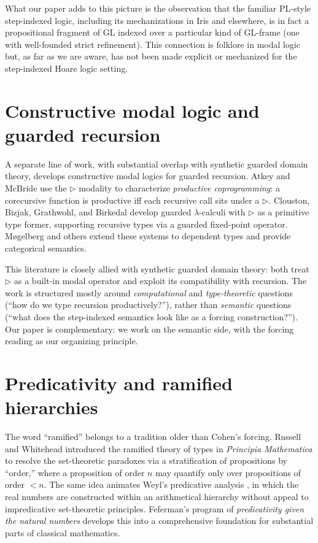 \documentclass[11pt]{article}
\begin{document}
What our paper adds to this picture is the observation that the
familiar PL-style step-indexed logic, including its mechanizations in
Iris and elsewhere, is in fact a propositional fragment of \textsf{GL}
indexed over a particular kind of \textsf{GL}-frame (one with
well-founded strict refinement). This connection is folklore in modal
logic but, as far as we are aware, has not been made explicit or
mechanized for the step-indexed Hoare logic setting.

\section{Constructive modal logic and guarded recursion}

A separate line of work, with substantial overlap with synthetic
guarded domain theory, develops constructive modal logics for
guarded recursion. Atkey and McBride \cite{atkey-mcbride2013} use the
$\triangleright$ modality to characterize \emph{productive
coprogramming}: a corecursive function is productive iff each recursive
call sits under a $\triangleright$. Clouston, Bizjak, Grathwohl, and
Birkedal \cite{clouston-et-al-2015,clouston-et-al-2017} develop
guarded $\lambda$-calculi with $\triangleright$ as a primitive type
former, supporting recursive types via a guarded fixed-point operator.
Møgelberg and others \cite{mogelberg2014,bizjak-mogelberg-2018}
extend these systems to dependent types and provide categorical
semantics.

This literature is closely allied with synthetic guarded domain
theory: both treat $\triangleright$ as a built-in modal operator and
exploit its compatibility with recursion. The work is structured
mostly around \emph{computational} and \emph{type-theoretic} questions
(``how do we type recursion productively?''), rather than
\emph{semantic} questions (``what does the step-indexed semantics
look like as a forcing construction?''). Our paper is complementary:
we work on the semantic side, with the forcing reading as our
organizing principle.

\section{Predicativity and ramified hierarchies}

The word ``ramified'' belongs to a tradition older than Cohen's
forcing. Russell and Whitehead \cite{russell-whitehead-PM} introduced
the ramified theory of types in \emph{Principia Mathematica} to
resolve the set-theoretic paradoxes via a stratification of
propositions by ``order,'' where a proposition of order $n$ may
quantify only over propositions of order $< n$. The same idea
animates Weyl's predicative analysis \cite{weyl1918}, in which the
real numbers are constructed within an arithmetical hierarchy without
appeal to impredicative set-theoretic principles. Feferman's program
of \emph{predicativity given the natural numbers} \cite{feferman1998}
develops this into a comprehensive foundation for substantial parts of
classical mathematics.
\end{document}
